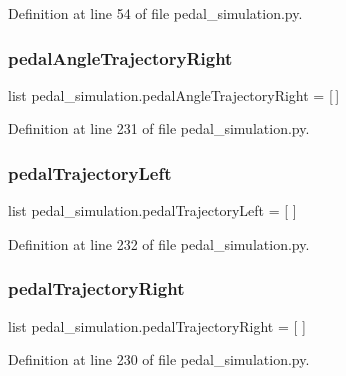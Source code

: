 Definition at line 54 of file pedal\+\_\+simulation.\+py.

\mbox{\label{namespacepedal__simulation_a72c8de21c0e38ec59eadc8cb8687ab98}} 
\subsubsection{\texorpdfstring{pedalAngleTrajectoryRight}{pedalAngleTrajectoryRight}}
{\footnotesize\ttfamily list pedal\+\_\+simulation.\+pedal\+Angle\+Trajectory\+Right = \mbox{[}$\,$\mbox{]}}



Definition at line 231 of file pedal\+\_\+simulation.\+py.

\mbox{\label{namespacepedal__simulation_a12e73e8d9659f2c2cc7a34402adc9698}} 
\subsubsection{\texorpdfstring{pedalTrajectoryLeft}{pedalTrajectoryLeft}}
{\footnotesize\ttfamily list pedal\+\_\+simulation.\+pedal\+Trajectory\+Left = \mbox{[} \mbox{]}}



Definition at line 232 of file pedal\+\_\+simulation.\+py.

\mbox{\label{namespacepedal__simulation_ac6c7d66bbded17d43bfbac519fd74972}} 
\subsubsection{\texorpdfstring{pedalTrajectoryRight}{pedalTrajectoryRight}}
{\footnotesize\ttfamily list pedal\+\_\+simulation.\+pedal\+Trajectory\+Right = \mbox{[} \mbox{]}}



Definition at line 230 of file pedal\+\_\+simulation.\+py.

